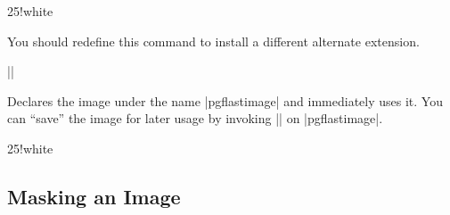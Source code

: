 \begin{command}{\pgfuseimage{}}
\begin{codeexample}[preamble={\usepackage{xxcolor}}]
\begin{colormixin}{25!white}
\begin{pgfpicture}
  \pgfpathrectangle{\pgfpoint{1cm}{5cm}}{\pgfpoint{1cm}{1cm}}
  \pgfpathrectangle{\pgfpoint{1cm}{3cm}}{\pgfpoint{1cm}{1cm}}
  \pgfpathrectangle{\pgfpoint{1cm}{1cm}}{\pgfpoint{1cm}{1cm}}
\end{pgfpicture}
\end{colormixin}
\end{codeexample}
\end{command}

\begin{command}{\pgfalternateextension}
    You should redefine this command to install a different alternate
    extension.

    \example |\def\pgfalternateextension{!25!white}|
\end{command}

\begin{command}{\pgfimage{}}
    Declares the image under the name |pgflastimage| and immediately uses it.
    You can ``save'' the image for later usage by invoking |\pgfaliasimage| on
    |pgflastimage|.
\begin{codeexample}[preamble={\usepackage{xxcolor}}]
\begin{colormixin}{25!white}
\begin{pgfpicture}

  \pgfpathrectangle{\pgfpoint{1cm}{5cm}}{\pgfpoint{1cm}{1cm}}
  \pgfpathrectangle{\pgfpoint{1cm}{3cm}}{\pgfpoint{1cm}{1cm}}
  \pgfpathrectangle{\pgfpoint{1cm}{1cm}}{\pgfpoint{1cm}{1cm}}
\end{pgfpicture}
\end{colormixin}
\end{codeexample}
\end{command}


\subsection{Masking an Image}

